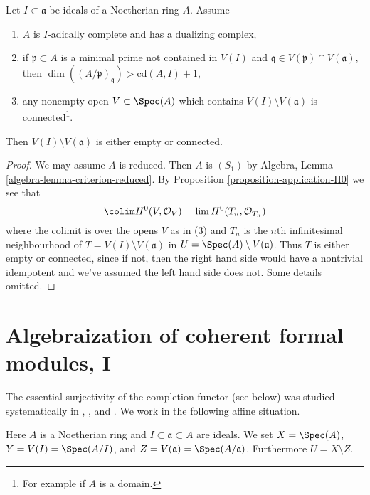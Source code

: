 \begin{lemma}
\label{lemma-connected}
Let $I \subset \mathfrak a$ be ideals of a Noetherian ring $A$.
Assume
\begin{enumerate}
\item $A$ is $I$-adically complete and has a dualizing complex,
\item if $\mathfrak p \subset A$ is a minimal prime not contained
in $V(I)$ and $\mathfrak q \in V(\mathfrak p) \cap V(\mathfrak a)$, then
$\dim((A/\mathfrak p)_\mathfrak q) > \text{cd}(A, I) + 1$,
\item any nonempty open $V \subset \Spec(A)$ which contains
$V(I) \setminus V(\mathfrak a)$ is connected\footnote{For example
if $A$ is a domain.}.
\end{enumerate}
Then $V(I) \setminus V(\mathfrak a)$ is either empty or connected.
\end{lemma}

\begin{proof}
We may assume $A$ is reduced. Then $A$ is $(S_1)$ by
Algebra, Lemma \ref{algebra-lemma-criterion-reduced}.
By Proposition \ref{proposition-application-H0} we see that
$$
\colim H^0(V, \mathcal{O}_V) = \lim H^0(T_n, \mathcal{O}_{T_n})
$$
where the colimit is over the opens $V$ as in (3) and
$T_n$ is the $n$th infinitesimal neighbourhood of
$T = V(I) \setminus V(\mathfrak a)$ in $U = \Spec(A) \setminus V(\mathfrak a)$.
Thus $T$ is either empty or connected, since if not, then the right hand side
would have a nontrivial idempotent and we've assumed the left hand
side does not. Some details omitted.
\end{proof}




\section{Algebraization of coherent formal modules, I}
\label{section-algebraization-modules}

\noindent
The essential surjectivity of the completion functor (see below)
was studied systematically in
\cite{SGA2}, \cite{MRaynaud-book}, and \cite{MRaynaud-paper}.
We work in the following affine situation.

\begin{situation}
\label{situation-algebraize}
Here $A$ is a Noetherian ring and $I \subset \mathfrak a \subset A$ are ideals.
We set $X = \Spec(A)$, $Y = V(I) = \Spec(A/I)$, and
$Z = V(\mathfrak a) = \Spec(A/\mathfrak a)$. Furthermore $U = X \setminus Z$.
\end{situation}


